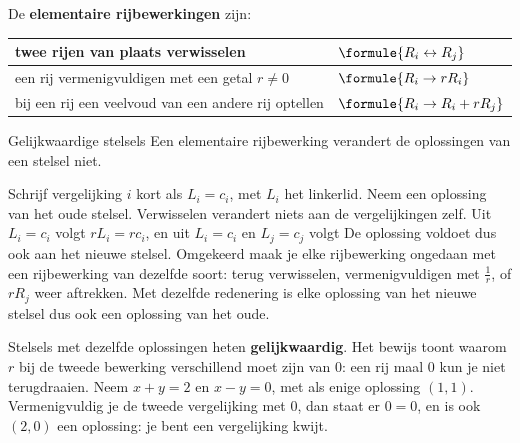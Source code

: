 \begin{theorie}
De \textbf{\textcolor{accent}{elementaire rijbewerkingen}} zijn:

\vspace{1mm}
{\centering{}\renewcommand{\arraystretch}{1.5}%
\begin{tabular}{|>{\centering\arraybackslash}m{6.6cm}|>{\centering\arraybackslash}m{3.6cm}|}
\hline
twee rijen van plaats verwisselen & $\formule{R_i \leftrightarrow R_j}$ \\ \hline
een rij vermenigvuldigen met een getal $r \neq 0$ & $\formule{R_i \to rR_i}$ \\ \hline
bij een rij een veelvoud van een andere rij optellen & $\formule{R_i \to R_i + rR_j}$ \\ \hline
\end{tabular}\par}

\begin{stelling}{Gelijkwaardige stelsels}
Een elementaire rijbewerking verandert de oplossingen van een stelsel niet.
\end{stelling}

\begin{bewijs}
Schrijf vergelijking $i$ kort als $L_i = c_i$, met $L_i$ het linkerlid. Neem een oplossing van het oude stelsel. Verwisselen verandert niets aan de vergelijkingen zelf. Uit $L_i = c_i$ volgt $rL_i = rc_i$, en uit $L_i = c_i$ en $L_j = c_j$ volgt
De oplossing voldoet dus ook aan het nieuwe stelsel. Omgekeerd maak je elke rijbewerking ongedaan met een rijbewerking van dezelfde soort: terug verwisselen, vermenigvuldigen met $\frac1r$, of $rR_j$ weer aftrekken. Met dezelfde redenering is elke oplossing van het nieuwe stelsel dus ook een oplossing van het oude.
\end{bewijs}
\end{theorie}

Stelsels met dezelfde oplossingen heten \textbf{gelijkwaardig}. Het bewijs toont waarom $r$ bij de tweede bewerking verschillend moet zijn van 0: een rij maal 0 kun je niet terugdraaien. Neem $x + y = 2$ en $x - y = 0$, met als enige oplossing $(1, 1)$. Vermenigvuldig je de tweede vergelijking met 0, dan staat er $0 = 0$, en is ook $(2, 0)$ een oplossing: je bent een vergelijking kwijt.

\begin{oefeningen}
\end{oefeningen}

